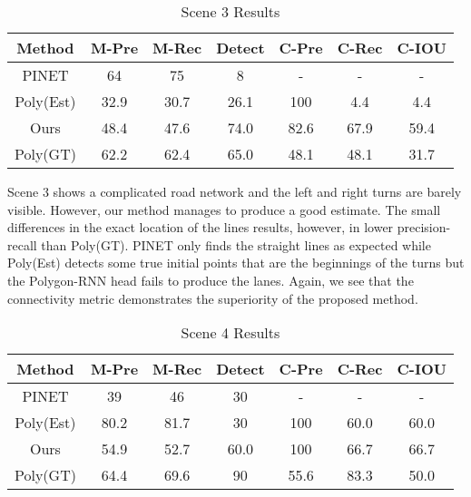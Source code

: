 \documentclass[10pt,twocolumn,letterpaper]{article}
\begin{document}
\begin{table}[h]
\begin{center}
\tabcolsep=0.08cm
\begin{tabular}{ |c|c|c|c|c|c|c| }

\hline
Method & M-Pre & M-Rec & Detect & C-Pre & C-Rec & C-IOU  \\
\hline

PINET & 64&75&8& -&-&- \\ 

Poly(Est) & 32.9&  30.7&26.1& 100&4.4&4.4 \\

Ours& 48.4& 47.6& 74.0& 82.6&67.9& 59.4 \\
\hline
Poly(GT) &  62.2&  62.4& 65.0&   48.1&48.1& 31.7 \\
\hline
\end{tabular}
\end{center}
\vspace{-1em}
\caption{Scene 3 Results}
\label{tab:imagewise_compare3}
\end{table}

Scene 3 shows a complicated road network and the left and right turns are barely visible. However, our method manages to produce a good estimate. The small differences in the exact location of the lines results, however, in lower precision-recall than Poly(GT). PINET only finds the straight lines as expected while Poly(Est) detects some true initial points that are the beginnings of the turns but the Polygon-RNN head fails to produce the lanes. Again, we see that the connectivity metric demonstrates the superiority of the proposed method.



\begin{table}[h]
\begin{center}
\tabcolsep=0.08cm
\begin{tabular}{ |c|c|c|c|c|c|c| }

\hline
Method & M-Pre & M-Rec & Detect & C-Pre & C-Rec & C-IOU  \\
\hline

PINET& 39 &46&30 &-&-&-\\ 

Poly(Est) &  80.2&  81.7 & 30 & 100& 60.0 & 60.0\\

Ours &  54.9 & 52.7 &60.0 & 100 & 66.7& 66.7\\
\hline
Poly(GT) & 64.4 & 69.6& 90& 55.6& 83.3 & 50.0 \\
\hline
\end{tabular}
\end{center}
\vspace{-1em}
\caption{Scene 4 Results}
\label{tab:imagewise_compare4}
\end{table}
\end{document}
